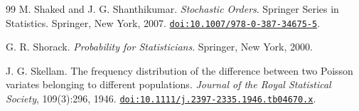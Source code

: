 \documentclass[11pt]{article}
\theoremstyle{definition}
\theoremstyle{remark}
\newcommand{\doi}[1]{\href{https://doi.org/#1}{\nolinkurl{doi:#1}}}
\begin{document}
\begin{thebibliography}{99}
M. Shaked and J. G. Shanthikumar.
\emph{Stochastic Orders}.
Springer Series in Statistics. Springer, New York, 2007.
\doi{10.1007/978-0-387-34675-5}.

G. R. Shorack.
\emph{Probability for Statisticians}.
Springer, New York, 2000.

J. G. Skellam.
The frequency distribution of the difference between two Poisson variates
belonging to different populations.
\emph{Journal of the Royal Statistical Society}, 109(3):296, 1946.
\doi{10.1111/j.2397-2335.1946.tb04670.x}.

\end{thebibliography}
\end{document}

